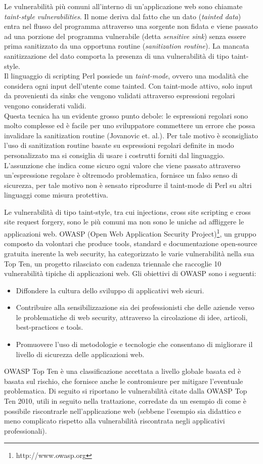 Le vulnerabilità più comuni all'interno di un'applicazione web sono chiamate \emph{taint-style vulnerabilities}. Il nome deriva dal fatto che un dato (\emph{tainted data}) entra nel flusso del programma attraverso una sorgente non fidata e viene passato ad una porzione del programma vulnerabile (detta \emph{sensitive sink}) senza essere prima sanitizzato da una opportuna routine (\emph{sanitization routine}). La mancata sanitizzazione del dato comporta la presenza di una vulnerabilità di tipo taint-style.\\
Il linguaggio di scripting Perl possiede un \emph{taint-mode}, ovvero una modalità che considera ogni input dell'utente come tainted. Con taint-mode attivo, solo input da provenienti da sinks che vengono validati attraverso espressioni regolari vengono considerati validi.\\
Questa tecnica ha un evidente grosso punto debole: le espressioni regolari sono molto complesse ed è facile per uno sviluppatore commettere un errore che possa invalidare la sanitization routine (Jovanovic et. al.\cite{pixy}). Per tale motivo è sconsigliato l'uso di sanitization routine basate su espressioni regolari definite in modo personalizzato ma si consiglia di usare i costrutti forniti dal linguaggio. L'assunzione che indica come sicuro ogni valore che viene passato attraverso un'espressione regolare è oltremodo problematica, fornisce un falso senso di sicurezza, per tale motivo non è sensato riprodurre il taint-mode di Perl su altri linguaggi come misura protettiva.

Le vulnerabilità di tipo taint-style, tra cui injections, cross site scripting e cross site request forgery, sono le più comuni ma non sono le uniche ad affliggere le applicazioni web.
OWASP (Open Web Application Security Project)\footnote{http://www.owasp.org}, un gruppo composto da volontari che produce tools, standard e documentazione open-source gratuita inerente la web security, ha categorizzato le varie vulnerabilità nella sua Top Ten\cite{topten}, un progetto rilasciato con cadenza triennale che raccoglie 10 vulnerabilità tipiche di applicazioni web. 
Gli obiettivi di OWASP sono i seguenti:
\begin{itemize}
\item Diffondere la cultura dello sviluppo di applicativi web sicuri.
\item Contribuire alla sensibilizzazione sia dei professionisti che delle aziende verso le problematiche di web security, attraverso la circolazione di idee, articoli, best-practices e tools.
\item Promuovere l’uso di metodologie e tecnologie che consentano di migliorare il livello di sicurezza delle applicazioni web.
\end{itemize}
OWASP Top Ten è una classificazione accettata a livello globale basata ed è basata sul rischio, che fornisce anche le contromisure per mitigare l'eventuale problematica. Di seguito si riportano le vulnerabilità citate dalla OWASP Top Ten 2010, utili in seguito nella trattazione, corredate da un esempio di come è possibile riscontrarle nell'applicazione web (sebbene l'esempio sia didattico e meno complicato rispetto alla vulnerabilità riscontrata negli applicativi professionali).

